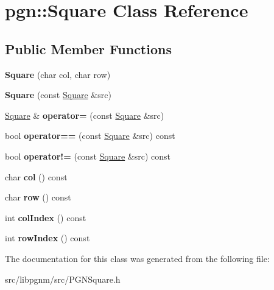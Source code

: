 \hypertarget{classpgn_1_1Square}{
\section{pgn::Square Class Reference}
\label{classpgn_1_1Square}
}
\subsection*{Public Member Functions}
\begin{DoxyCompactItemize}
\item 
\hypertarget{classpgn_1_1Square_ab5173e4b49268059177641daf43ed829}{
{\bfseries Square} (char col, char row)}
\label{classpgn_1_1Square_ab5173e4b49268059177641daf43ed829}

\item 
\hypertarget{classpgn_1_1Square_a2b8362bb3a613bbf127075cc0847d197}{
{\bfseries Square} (const \hyperlink{classpgn_1_1Square}{Square} \&src)}
\label{classpgn_1_1Square_a2b8362bb3a613bbf127075cc0847d197}

\item 
\hypertarget{classpgn_1_1Square_a095e106c340960efae980e0ce6dbbb5b}{
\hyperlink{classpgn_1_1Square}{Square} \& {\bfseries operator=} (const \hyperlink{classpgn_1_1Square}{Square} \&src)}
\label{classpgn_1_1Square_a095e106c340960efae980e0ce6dbbb5b}

\item 
\hypertarget{classpgn_1_1Square_a7183b7dc224b078e3cac81b3b388be54}{
bool {\bfseries operator==} (const \hyperlink{classpgn_1_1Square}{Square} \&src) const }
\label{classpgn_1_1Square_a7183b7dc224b078e3cac81b3b388be54}

\item 
\hypertarget{classpgn_1_1Square_ab748accb4d314ffa8a0baedbe89cdc37}{
bool {\bfseries operator!=} (const \hyperlink{classpgn_1_1Square}{Square} \&src) const }
\label{classpgn_1_1Square_ab748accb4d314ffa8a0baedbe89cdc37}

\item 
\hypertarget{classpgn_1_1Square_a1f2ab6151f39e6d68bbbd8eaf9816c05}{
char {\bfseries col} () const }
\label{classpgn_1_1Square_a1f2ab6151f39e6d68bbbd8eaf9816c05}

\item 
\hypertarget{classpgn_1_1Square_a98c387437d68911e2f9fffaaf6820577}{
char {\bfseries row} () const }
\label{classpgn_1_1Square_a98c387437d68911e2f9fffaaf6820577}

\item 
\hypertarget{classpgn_1_1Square_a7320a5b606d20baf8b8d64d20513334c}{
int {\bfseries colIndex} () const }
\label{classpgn_1_1Square_a7320a5b606d20baf8b8d64d20513334c}

\item 
\hypertarget{classpgn_1_1Square_ac0e8cea913be6764661adc4b6faef255}{
int {\bfseries rowIndex} () const }
\label{classpgn_1_1Square_ac0e8cea913be6764661adc4b6faef255}

\end{DoxyCompactItemize}


The documentation for this class was generated from the following file:\begin{DoxyCompactItemize}
\item 
src/libpgnm/src/PGNSquare.h\end{DoxyCompactItemize}
